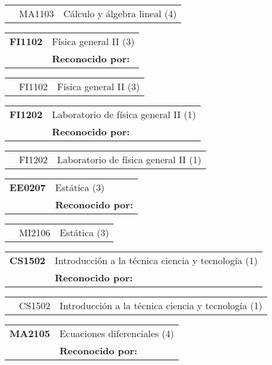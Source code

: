 \documentclass[letterpaper]{article}%
\begin{document}
\begin{tabularx}{\textwidth}{p{1.5cm}p{1.5cm}p{10cm}}%
&MA1103&Cálculo y álgebra lineal (4)\\%
\end{tabularx}%
\begin{tabularx}{\textwidth}{p{1.5cm}p{10cm}}%
\textbf{FI1102}&Física general II (3)\\%
&\textbf{Reconocido por: }\\%
\end{tabularx}%
\begin{tabularx}{\textwidth}{p{1.5cm}p{1.5cm}p{10cm}}%
&FI1102&Física general II (3)\\%
\end{tabularx}%
\begin{tabularx}{\textwidth}{p{1.5cm}p{10cm}}%
\textbf{FI1202}&Laboratorio de física general II (1)\\%
&\textbf{Reconocido por: }\\%
\end{tabularx}%
\begin{tabularx}{\textwidth}{p{1.5cm}p{1.5cm}p{10cm}}%
&FI1202&Laboratorio de física general II (1)\\%
\end{tabularx}%
\begin{tabularx}{\textwidth}{p{1.5cm}p{10cm}}%
\textbf{EE0207}&Estática (3)\\%
&\textbf{Reconocido por: }\\%
\end{tabularx}%
\begin{tabularx}{\textwidth}{p{1.5cm}p{1.5cm}p{10cm}}%
&MI2106&Estática (3)\\%
\end{tabularx}%
\begin{tabularx}{\textwidth}{p{1.5cm}p{10cm}}%
\textbf{CS1502}&Introducción a la técnica ciencia y tecnología (1)\\%
&\textbf{Reconocido por: }\\%
\end{tabularx}%
\begin{tabularx}{\textwidth}{p{1.5cm}p{1.5cm}p{10cm}}%
&CS1502&Introducción a la técnica ciencia y tecnología (1)\\%
\end{tabularx}%
\begin{tabularx}{\textwidth}{p{1.5cm}p{10cm}}%
\textbf{MA2105}&Ecuaciones diferenciales (4)\\%
&\textbf{Reconocido por: }\\%
\end{tabularx}%
\end{document}

